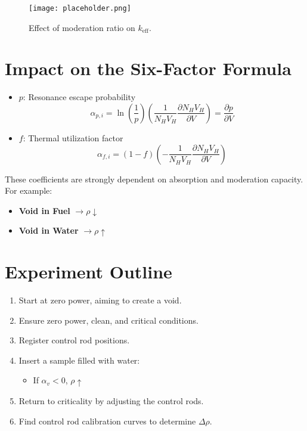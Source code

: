 \begin{figure}[H]
    \centering
    \texttt{[image: placeholder.png]}
    \caption{Effect of moderation ratio on $k_{\text{eff}}$.}
\end{figure}

\section{Impact on the Six-Factor Formula}

\begin{itemize}
    \item $p$: Resonance escape probability
    \begin{equation}
        \alpha_{p,i} = \ln \left( \frac{1}{p} \right) \left( \frac{1}{N_H V_H} \frac{\partial N_H V_H}{\partial V} \right) = \frac{\partial p}{\partial V}
    \end{equation}
    
    \item $f$: Thermal utilization factor
    \begin{equation}
        \alpha_{f,i} = (1 - f) \left( - \frac{1}{N_H V_H} \frac{\partial N_H V_H}{\partial V} \right)
    \end{equation}
\end{itemize}

These coefficients are strongly dependent on absorption and moderation capacity. For example:
\begin{itemize}
    \item \textbf{Void in Fuel} $\rightarrow \rho \downarrow$
    \item \textbf{Void in Water} $\rightarrow \rho \uparrow$
\end{itemize}

\section{Experiment Outline}
\begin{enumerate}
    \item Start at zero power, aiming to create a void.
    \item Ensure zero power, clean, and critical conditions.
    \item Register control rod positions.
    \item Insert a sample filled with water:
    \begin{itemize}
        \item If $\alpha_v < 0$, $\rho \uparrow$
    \end{itemize}
    \item Return to criticality by adjusting the control rods.
    \item Find control rod calibration curves to determine $\Delta \rho$.
\end{enumerate}

